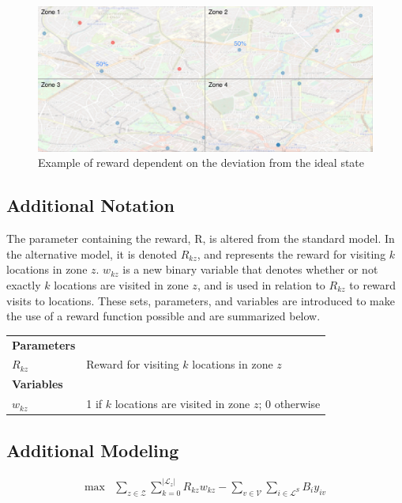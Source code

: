 \begin{figure}[h]
    \centering
    \includegraphics[width=15cm]{Images/alternative_model_ex.png}
    \caption{Example of reward dependent on the deviation from the ideal state}
    \label{fig:alternative_model}
\end{figure}

\break

\subsection{Additional Notation}

The parameter containing the reward, R, is altered from the standard model. In the alternative model, it is denoted $R_{kz}$, and represents the reward for visiting $k$ locations in zone $z$. $w_{kz}$ is a new binary variable that denotes whether or not exactly $k$ locations are visited in zone $z$, and is used in relation to $R_{kz}$ to reward visits to locations. These sets, parameters, and variables are introduced to make the use of a reward function possible and are summarized below. 

\begin{tabular}{p{1.5cm} p{12.5cm}}
    \textbf{Parameters}  \\
    $R_{kz}$ & Reward for visiting $k$ locations in zone $z$\\
    \textbf{Variables}  \\
    $w_{kz}$ & 1 if $k$ locations are visited in zone $z$; 0 otherwise
\end{tabular}

\subsection{Additional Modeling} \label{alt_model_additional_modeling}
\begin{eqnarray}
    \max & \displaystyle\sum_{z\in \mathcal{Z}}\displaystyle\sum_{k=0}^{|\mathcal{L}_z|} R_{kz}w_{kz} - \displaystyle\sum_{v\in \mathcal{V}} \displaystyle\sum_{i \in \mathcal{L}^{S}} B_{i}y_{iv} \label{eq:obj_alt}
\end{eqnarray}

